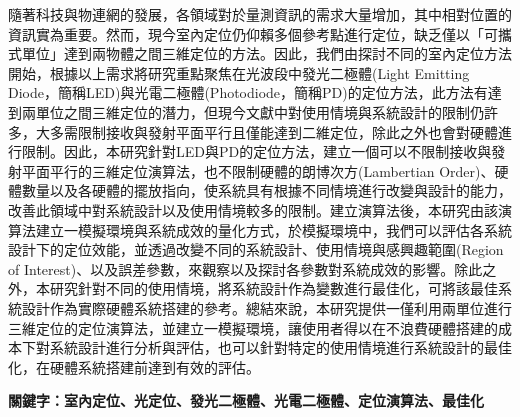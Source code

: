 \begin{abstractCH}

  隨著科技與物連網的發展，各領域對於量測資訊的需求大量增加，其中相對位置的資訊實為重要。然而，現今室內定位仍仰賴多個參考點進行定位，缺乏僅以「可攜式單位」達到兩物體之間三維定位的方法。因此，我們由探討不同的室內定位方法開始，根據以上需求將研究重點聚焦在光波段中發光二極體(Light Emitting Diode，簡稱LED)與光電二極體(Photodiode，簡稱PD)的定位方法，此方法有達到兩單位之間三維定位的潛力，但現今文獻中對使用情境與系統設計的限制仍許多，大多需限制接收與發射平面平行且僅能達到二維定位，除此之外也會對硬體進行限制。因此，本研究針對LED與PD的定位方法，建立一個可以不限制接收與發射平面平行的三維定位演算法，也不限制硬體的朗博次方(Lambertian Order)、硬體數量以及各硬體的擺放指向，使系統具有根據不同情境進行改變與設計的能力，改善此領域中對系統設計以及使用情境較多的限制。建立演算法後，本研究由該演算法建立一模擬環境與系統成效的量化方式，於模擬環境中，我們可以評估各系統設計下的定位效能，並透過改變不同的系統設計、使用情境與感興趣範圍(Region of Interest)、以及誤差參數，來觀察以及探討各參數對系統成效的影響。除此之外，本研究針對不同的使用情境，將系統設計作為變數進行最佳化，可將該最佳系統設計作為實際硬體系統搭建的參考。總結來說，本研究提供一僅利用兩單位進行三維定位的定位演算法，並建立一模擬環境，讓使用者得以在不浪費硬體搭建的成本下對系統設計進行分析與評估，也可以針對特定的使用情境進行系統設計的最佳化，在硬體系統搭建前達到有效的評估。


  \vspace{1cm}
  \noindent \textbf{關鍵字：室內定位、光定位、發光二極體、光電二極體、定位演算法、最佳化}

\end{abstractCH}

